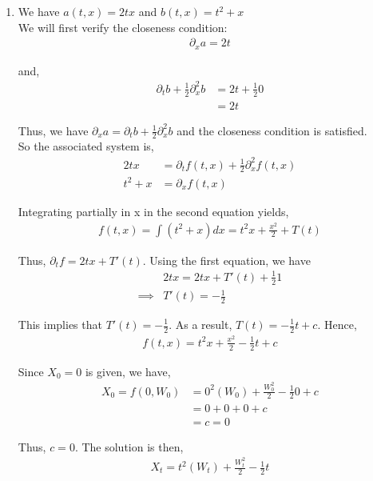\documentclass[12pt]{article}
\begin{document}
\begin{enumerate}[\alph*)]
\item We have $a(t,x) = 2tx$ and $b(t,x) = t^2 + x$\\

We will first verify the closeness condition:
\begin{align*}
\partial_x a = 2t
\end{align*}

and,
\begin{align*}
\partial_t b + \frac{1}{2} \partial_x^2 b &= 2t + \frac{1}{2}0\\
&= 2t
\end{align*}

Thus, we have $\partial_x a = \partial_t b + \frac{1}{2} \partial_x^2 b$ and the closeness condition is satisfied.\\

So the associated system is,
\begin{align*}
2tx &= \partial_t f(t,x) + \frac{1}{2} \partial_x^2 f(t,x)\\
t^2 + x &= \partial_x f(t,x)
\end{align*}

Integrating partially in x in the second equation yields,
\begin{align*}
f(t,x) = \int (t^2 + x) dx = t^2x + \frac{x^2}{2} + T(t)
\end{align*}

Thus, $\partial_t f = 2tx + T'(t)$. Using the first equation, we have
\begin{align*}
&2tx = 2tx + T'(t) + \frac{1}{2}1\\
\implies &T'(t) = -\frac{1}{2}
\end{align*}

This implies that $T'(t) = -\frac{1}{2}$. As a result, $T(t) = -\frac{1}{2}t + c$. Hence,
\begin{align*}
f(t,x) = t^2x + \frac{x^2}{2} - \frac{1}{2}t + c
\end{align*}

Since $X_0 = 0$ is given, we have,
\begin{align*}
X_0 = f(0, W_0) &= 0^2(W_0) + \frac{W_0^2}{2} - \frac{1}{2}0 + c\\
&= 0 + 0 + 0 + c\\
&= c = 0
\end{align*}

Thus, $c = 0$. The solution is then,
\begin{align*}
X_t = t^2(W_t) + \frac{W_t^2}{2} - \frac{1}{2}t
\end{align*}


\end{enumerate}
\end{document}
